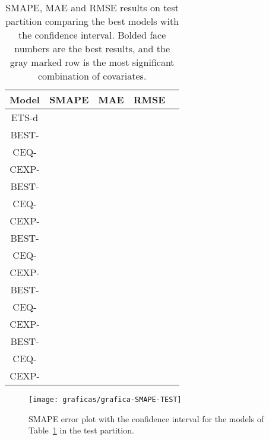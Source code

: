 \documentclass[energies,article,accept,moreauthors,pdftex,12pt,a4paper]{mdpi}
\begin{document}
\begin{table}[H]
 \scriptsize \centering

 \begin{tabular}{ccccccccccc}
 \toprule
 {\bf Model} & \multicolumn{3}{c}{{\bf SMAPE}} & \multicolumn{3}{c}{{\bf MAE}} & \multicolumn{3}{c}{{\bf RMSE}}\\
 \midrule
 ETS-d &  &  &  &  &  &  &  &  & \\
 \hline
 BEST-   &  &  &  &  &  &  &  &  & \\
 CEQ-   &  &  &  &  &  &  &  &  & \\
 CEXP-   &  &  &  &  &  &  &  &  & \\
 \hline
 BEST-  &  &  &  &  &  &  &  &  & \\
 CEQ-   &  &  &  &  &  &  &  &  & \\
 \rowcolor{lightgray}
 CEXP-  &  &  &  &  &  &  &  &  & \\
 \hline
 BEST-  &  &  &  &  &  &  &  &  & \\
 CEQ-  &  &  &  &  &  &  &  &  & \\
 CEXP-  &  &  &  &  &  &  &  &  & \\
 \hline
 BEST-  &  &  &  &  &  &  &  &  & \\
 CEQ-  &  &  &  &  &  &  &  &  & \\
 CEXP-  &  &  &  &  &  &  &  &  & \\
 \hline
 BEST- &  &  &  &  &  &  &  &  & \\
 CEQ- &  &  &  &  &  &  &  &  & \\
 CEXP- &  &  &  &  &  &  &  &  & \\
 \bottomrule
 \end{tabular}

 \normalsize
 \caption{SMAPE, MAE and RMSE results on test partition
 comparing the best models with the  confidence interval. Bolded face
 numbers are the best results, and the gray marked row is the most significant
 combination of covariates.}\label{tab:testresults}
\end{table}

\vspace {-9 pt}

\begin{figure}[H]
 \centering
 \texttt{[image: graficas/grafica-SMAPE-TEST]}\\
 \caption{SMAPE error plot with the  confidence interval for the models
 of Table~\ref{tab:testresults} in the test partition.\label{fig:test-smape}}
\end{figure}
\end{document}
